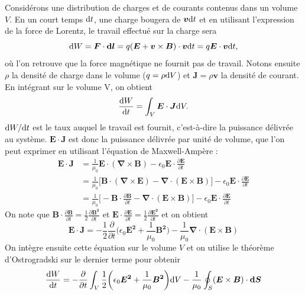 Considérons une distribution de charges et de courants contenus dans un volume $V$. En un court temps $\mathrm{d} t$, une charge bougera de $\bm{v}\mathrm{d} t$ et en utilisant l'expression de la force de Lorentz, le travail effectué sur la charge sera
\begin{equation*}
\mathrm{d} W = \bm{F}\cdot\bm{\mathrm{d} l} = q(\bm{E}+\bm{v}\times\bm{B})\cdot\bm{v}\mathrm{d} t = q\bm{E}\cdot \bm{v} \mathrm{d} t,
\end{equation*}
où l'on retrouve que la force magnétique ne fournit pas de travail. Notons ensuite $\rho$ la densité de charge dans le volume ($q = \rho \mathrm{d} V$) et $\bm{J} =\rho \bm{v}$ la densité de courant. En intégrant sur le volume V, on obtient
\begin{equation*}
\frac{\mathrm{d} W}{\mathrm{d} t} = \int_V \bm{E} \cdot \bm{J} \mathrm{d} V.
\end{equation*}
$\mathrm{d} W/\mathrm{d} t$ est le taux auquel le travail est fournit, c'est-à-dire la puissance délivrée au système. $\bm{E} \cdot \bm{J}$ est donc la puissance délivrée par unité de volume, que l'on peut exprimer en utilisant l'équation de Maxwell-Ampère :
\begin{align*}
\bm{E} \cdot \bm{J} &= \frac{1}{\mu_0}\bm{E} \cdot (\bm{\nabla} \times \bm{B})-\epsilon_0\bm{E}\cdot\frac{\partial\bm{E}}{\partial t}\\
&= \frac{1}{\mu_0}\bigl[\bm{B} \cdot (\bm{\nabla} \times \bm{E})-\bm{\nabla} \cdot (\bm{E} \times \bm{B})\bigr]-\epsilon_0\bm{E}\cdot\frac{\partial\bm{E}}{\partial t}\\
&= \frac{1}{\mu_0}\bigl[-\bm{B} \cdot \frac{\partial\bm{B}}{\partial t}-\bm{\nabla} \cdot (\bm{E} \times \bm{B})\bigr]-\epsilon_0\bm{E}\cdot\frac{\partial\bm{E}}{\partial t}
\end{align*}
On note que $\bm{B} \cdot \frac{\partial\bm{B}}{\partial t} = \frac{1}{2}\frac{\partial\bm{B^2}}{\partial t}$ et $\bm{E} \cdot \frac{\partial\bm{E}}{\partial t} = \frac{1}{2}\frac{\partial\bm{E^2}}{\partial t}$ et on obtient
\begin{equation*}
\bm{E} \cdot \bm{J} = -\frac{1}{2}\frac{\partial}{\partial t}\biggl(\epsilon_0\bm{E^2}+\frac{1}{\mu_0}\bm{B^2}\biggl)-\frac{1}{\mu_0}\bm{\nabla} \cdot (\bm{E} \times \bm{B})
\end{equation*}
On intègre ensuite cette équation sur le volume $V$ et on utilise le théorème d'Ostrogradski sur le dernier terme pour obtenir
\begin{equation*}
\frac{\mathrm{d} W}{\mathrm{d} t} = -\frac{\partial}{\partial t}\int_V\frac{1}{2}\biggl(\epsilon_0\bm{E^2}+\frac{1}{\mu_0}\bm{B^2}\biggl)\mathrm{d} V-\frac{1}{\mu_0} \oint_S(\bm{E} \times \bm{B})\cdot\bm{\mathrm{d} S}
\end{equation*}
